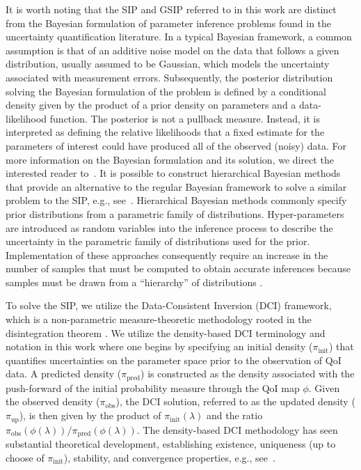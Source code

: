 \documentclass{article}
\newcommand{\initdens}{\pi_{\text{init}}}
\newcommand{\updatedens}{\pi_{\text{up}}}
\newcommand{\predictdens}{\pi_\text{pred}}
\newcommand{\obsdens}{\pi_{\text{obs}}}
\begin{document}
It is worth noting that the SIP and GSIP referred to in this work are distinct from the Bayesian formulation of parameter inference problems found in the uncertainty quantification literature. 
In a typical Bayesian framework, a common assumption is that of an additive noise model on the data that follows a given distribution, usually assumed to be Gaussian, which models the uncertainty associated with measurement errors.
Subsequently, the posterior distribution solving the Bayesian formulation of the problem is defined by a conditional density given by the product of a prior density on parameters and a data-likelihood function. 
The posterior is not a pullback measure. 
Instead, it is interpreted as defining the relative likelihoods that a fixed estimate for the parameters of interest could have produced all of the observed (noisy) data.
For more information on the Bayesian formulation and its solution, we direct the interested reader to~\cite{CKS14, Gelman2013, CDS10, KO2001, BMP+1994, Fitzpatrick1991, Burger_2014, PMS+14, APS+16}.
It is possible to construct hierarchical Bayesian methods that provide an alternative to the regular Bayesian framework to solve a similar problem to the SIP, e.g., see~\cite{Wikle1998}.
Hierarchical Bayesian methods commonly specify prior distributions from a parametric family of distributions.
Hyper-parameters are introduced as random variables into the inference process to describe the uncertainty in the parametric family of distributions used for the prior. 
Implementation of these approaches consequently require an increase in the number of samples that must be computed to obtain accurate inferences because samples must be drawn from a ``hierarchy'' of distributions \cite{pyMC3}.

To solve the SIP, we utilize the Data-Consistent Inversion (DCI) framework, which is a non-parametric measure-theoretic methodology rooted in the disintegration theorem \cite{BET+14, BJW18a, BBE24}. 
We utilize the density-based DCI terminology and notation in this work where one begins by specifying an initial density ($\initdens$) that quantifies uncertainties on the parameter space prior to the observation of QoI data.
A predicted density ($\predictdens$) is constructed as the density associated with the push-forward of the initial probability measure through the QoI map $\phi$. 
Given the observed density ($\obsdens$), the DCI solution, referred to as the updated density ($\updatedens$), is then given by the product of $\initdens(\lambda)$ and the ratio $\obsdens(\phi(\lambda)) / \predictdens(\phi(\lambda))$. 
The density-based DCI methodology has seen substantial theoretical development, establishing existence, uniqueness (up to choose of $\initdens$), stability, and convergence properties, e.g., see~\cite{BJW18a, BWY20, BSW+25}.
\end{document}
